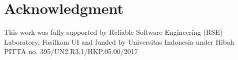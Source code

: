 \documentclass[conference]{IEEEtran}
\begin{document}
\section*{Acknowledgment}
This work was fully supported by Reliable Software Engineering (RSE) Laboratory, Fasilkom UI and funded by Universitas Indonesia under Hibah PITTA no. 395/UN2.R3.1/HKP.05.00/2017





%
%
%
\end{document}
